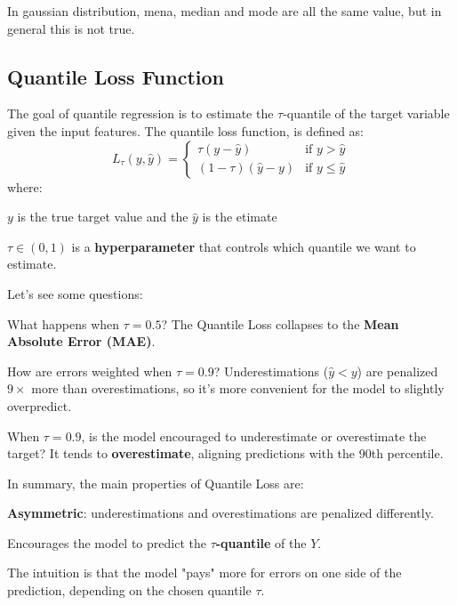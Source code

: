 \begin{infobox}[Note]
    In gaussian distribution, mena, median and mode are all the same value, but in general this is not true.
\end{infobox}

\subsection{Quantile Loss Function}
The goal of quantile regression is to estimate the $\tau$-quantile of the target variable given the input features. The quantile loss function, is defined as:
\[
L_{\tau}(y, \hat{y}) = \begin{cases}
\tau (y - \hat{y}) & \text{if } y > \hat{y} \\
(1 - \tau) (\hat{y} - y) & \text{if } y \leq \hat{y}
\end{cases}
\]
where: 
\begin{compactitemize}
    \item $y$ is the true target value and the $\hat{y}$ is the etimate
    \item $\tau \in (0, 1)$ is a \textbf{hyperparameter} that controls which quantile we want to estimate.
\end{compactitemize}

Let's see some questions:
\begin{compactitemize}
    \item What happens when $\tau = 0.5$?  
    The Quantile Loss collapses to the \textbf{Mean Absolute Error (MAE)}.
    
    \item How are errors weighted when $\tau = 0.9$?  
    Underestimations ($\hat{y} < y$) are penalized $9\times$ more than overestimations, so it’s more convenient for the model to slightly overpredict.
    
    \item When $\tau = 0.9$, is the model encouraged to underestimate or overestimate the target?  
    It tends to \textbf{overestimate}, aligning predictions with the 90th percentile.
\end{compactitemize}

In summary, the main properties of Quantile Loss are:
\begin{compactitemize}
    \item \textbf{Asymmetric}: underestimations and overestimations are penalized differently.
    \item Encourages the model to predict the \textbf{$\tau$-quantile} of the $Y$.
\end{compactitemize}
The intuition is that the model "pays" more for errors on one side of the prediction, depending on the chosen quantile $\tau$.